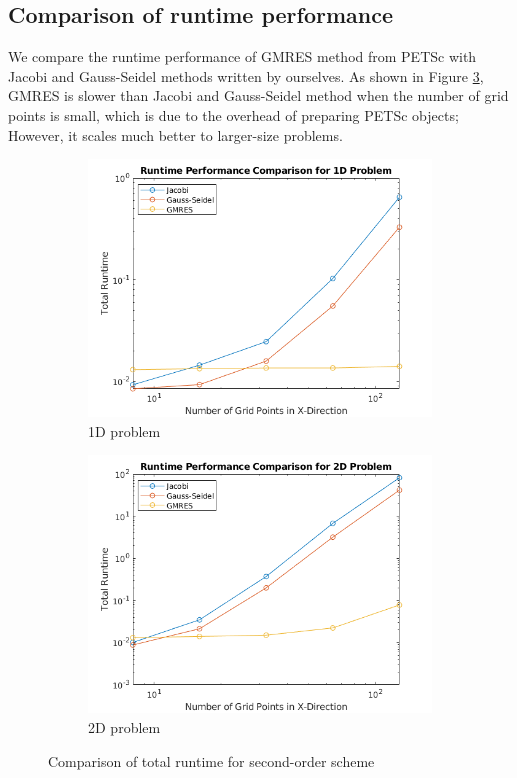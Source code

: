 \documentclass{article}
\begin{document}
\subsection{Comparison of runtime performance}
We compare the runtime performance of GMRES method from PETSc with Jacobi and Gauss-Seidel methods written
by ourselves. As shown in Figure \ref{fig:performance}, GMRES is slower than Jacobi and Gauss-Seidel method
when the number of grid points is small, which is due to the overhead of preparing PETSc objects; However, it
scales much better to larger-size problems.

\begin{figure}[ht]
    \centering
    \begin{subfigure}[t]{.5\textwidth}
        \centering
        \includegraphics[width=1.0\linewidth]{perfomance_1D.png}
        \caption{1D problem}
    \label{fig:performance_1D}
    \end{subfigure}%
    \begin{subfigure}[t]{.5\textwidth}
        \centering
        \includegraphics[width=1.0\linewidth]{performance_2D.png}
        \caption{2D problem}
    \label{fig:performance_2D}
    \end{subfigure}
    \caption{Comparison of total runtime for second-order scheme}
\label{fig:performance}
\end{figure}
\end{document}
